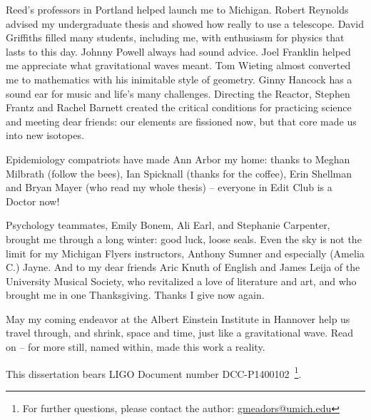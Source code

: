 \documentclass[leqno,twoside]{report}
\theoremstyle{plain}
\theoremstyle{definition}
\theoremstyle{remark}
\numberwithin{theorem}{chapter}        %
\begin{document}
Reed's professors in Portland helped launch me to Michigan.
Robert Reynolds advised my undergraduate thesis and showed how really to use a telescope.
David Griffiths filled many students, including me, with enthusiasm for physics that lasts to this day.
Johnny Powell always had sound advice.
Joel Franklin helped me appreciate what gravitational waves meant.
Tom Wieting almost converted me to mathematics with his inimitable style of geometry.
Ginny Hancock has a sound ear for music and life's many challenges.
Directing the Reactor, Stephen Frantz and Rachel Barnett created the critical conditions for practicing science and meeting dear friends: our elements are fissioned now, but that core made us into new isotopes.

Epidemiology compatriots have made Ann Arbor my home: thanks to Meghan Milbrath (follow the bees), Ian Spicknall (thanks for the coffee), Erin Shellman and Bryan Mayer (who read my whole thesis) -- everyone in Edit Club is a Doctor now!

Psychology teammates, Emily Bonem, Ali Earl, and Stephanie Carpenter, brought me through a long winter: good luck, loose seals.
Even the sky is not the limit for my Michigan Flyers instructors, Anthony Sumner and especially (Amelia C.) Jayne.
And to my dear friends Aric Knuth of English and James Leija of the University Musical Society, who revitalized a love of literature and art, and who brought me in one Thanksgiving.
Thanks I give now again.

May my coming endeavor at the Albert Einstein Institute in Hannover help us travel through, and shrink, space and time, just like a gravitational wave.
Read on -- for more still, named within, made this work a reality.

This dissertation bears LIGO Document number DCC-P1400102~\footnote{For further questions, please contact the author: \href{mailto:gmeadors@umich.edu}{gmeadors@umich.edu}}.



\tableofcontents
\listoffigures
\listoftables
\listofappendices


\startthechapters 
\end{document}
